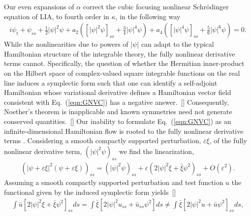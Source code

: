 \documentclass[aps,graphicx,reprint,onecolumn,12pt,tightenlines,longbibliography]{revtex4-1}
\newcommand{\sas}[2]{{#2}}
\begin{document}
Our even expansions of $\alpha$ correct the cubic focusing nonlinear Schr\"odinger equation of LIA\sas{}{, to fourth order in $\kappa$,}  in the following way 
%
\begin{align}\label{eqn:GNVC}
i\psi_{t}+\psi_{ss} + \frac{1}{2} |\psi|^{2} \psi +
   a_2 \left(\left[|\psi|^{2} \psi\right]_{ss} + \frac{3}{4}|\psi|^{4}\psi\right)+a_4 \left(\left[|\psi|^{4} \psi\right]_{ss} + \frac{5}{6}|\psi|^{6}\psi\right) =0.
\end{align}
%
\sas{and indicates a straightforward pattern to arbitrary order, i.e., $a_{n}([|\psi|^{n} \psi]_{ss} + (n+1) |\psi|^{n+2}/(n+2))$.}{} While the \sas{power}{} nonlinearities \sas{}{due to powers of $|\psi|$} can adapt to the typical Hamiltonian structure of the integrable theory, the fully nonlinear \sas{terms}{derivative terms} cannot. Specifically, the question of whether the Hermitian inner-product on the Hilbert space of complex-valued square integrable functions on the real line induces a symplectic form such that one can identify a self-adjoint Hamiltonian whose variational derivative defines a Hamiltonian vector field consistent with Eq.~(\ref{eqn:GNVC}) has a negative answer.~[] Consequently, Noether's theorem is inapplicable and known symmetries need not generate conserved quantities.~[] Our inability to formulate Eq.~(\ref{eqn:GNVC}) as an infinite-dimensional Hamiltonian flow is rooted to the fully nonlinear \sas{}{derivative} terms \sas{given by, $(|\psi|^{2n}\psi)_{ss}$}{}. Considering a \sas{linear}{smooth compactly supported} perturbation\sas{}{, $ \varepsilon \xi$,} of the \sas{lowest non-trivial order}{ fully nonlinear derivative term, $(|\psi|^{2}\psi)_{ss}$} we find \sas{}{the linearization}, 
%
\begin{align}\label{eqn:Ham1}
\left( |\psi + \varepsilon \xi |^{2} (\psi + \varepsilon \xi)\right)_{ss} = \left(|\psi|^{2} \psi\right)_{ss}+ \varepsilon \left(2|\psi|^{2} \xi + \bar{\xi}\psi^{2}\right)_{ss}+O(\varepsilon^{2}).
\end{align}
%
Assuming a smooth compactly supported perturbation and test function $u$ the functional given by the induced symplectic form yields~[]
%
\begin{align}\label{eqn:Ham2}
\int  \bar{u}\left[2|\psi|^{2} \xi + \bar{\xi}\psi^{2}\right]_{ss}   ds = \int \bar{\xi}\left[2|\psi|^{2} u_{ss} + \bar{u}_{ss} \psi^{2}\right]   ds \neq \int \bar{\xi}\left[2|\psi|^{2} u + \bar{u} \psi^{2}\right]_{ss}   ds,
\end{align}
\end{document}
